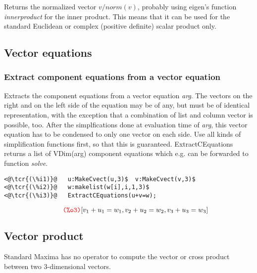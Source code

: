 \documentclass[../Maxima_Workbook.tex]{subfiles}
\begin{document}
\lz Returns the normalized vector $ v / norm(v) $, probably using eigen's function \emph{innerproduct} for the inner product. This means that it can be used for the standard Euclidean or complex (positive definite) scalar product only.

\subsection{Vector equations}

\subsubsection{Extract component equations from a vector equation}

\lz {} \hfill {}

\lz Extracts the component equations from a vector equation \emph{arg}. The vectors on the right and on the left side of the equation may be of any, but must be of identical representation, with the exception that a combination of list and column vector is possible, too. After the simplfications done at evaluation time of \emph{arg}, this vector equation has to be condensed to only one vector on each side. Use all kinds of simplification functions first, so that this is guaranteed. ExtractCEquations returns a list of VDim(arg) component equations which e.g. can be forwarded to function \emph{solve}.

\begin{small}
\color{blue}
\begin{lstlisting}
<@\tcr{(\%i1)}@   u:MakeCvect(u,3)$  v:MakeCvect(v,3)$
<@\tcr{(\%i2)}@   w:makelist(w[i],i,1,3)$
<@\tcr{(\%i3)}@   ExtractCEquations(u+v=w);
\end{lstlisting}
\vspace{-5mm} \[\tag*{\tcr{\ttfamily (\%o3)}} [{v_1}+{u_1}={w_1},{v_2}+{u_2}={w_2},{v_3}+{u_3}={w_3}] \]
\color{black}
\end{small}

\vspace{-6mm} \subsection{Vector product}

Standard Maxima has no operator to compute the vector or cross product between two 3-dimensional vectors.
\end{document}
